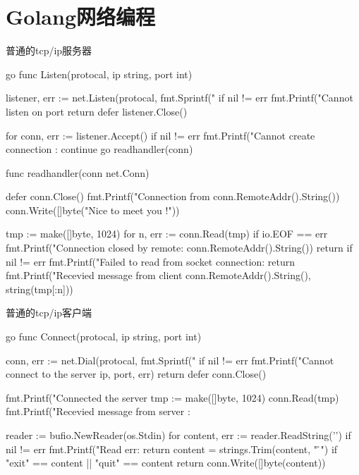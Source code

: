 \section{Golang网络编程}
\begin{outline}[enumerate]

  \1 普通的tcp/ip服务器

\begin{code-in-enumerate}{go}
func Listen(protocal, ip string, port int) {
    listener, err := net.Listen(protocal, fmt.Sprintf("%
    if nil != err {
        fmt.Printf("Cannot listen on port %
        return
    }
    defer listener.Close()

    for {
        conn, err := listener.Accept()
        if nil != err {
            fmt.Printf("Cannot create connection :%
            continue
        }
        go readhandler(conn)
    }
}

func readhandler(conn net.Conn) {
    defer conn.Close()
    fmt.Printf("Connection from %
    conn.RemoteAddr().String())
    conn.Write([]byte("Nice to meet you !\n"))

    tmp := make([]byte, 1024)
    for {
        n, err := conn.Read(tmp)
        if io.EOF == err {
            fmt.Printf("Connection closed by remote: %
            conn.RemoteAddr().String())
            return
        }
        if nil != err {
            fmt.Printf("Failed to read from socket connection:%
            return
        }
        fmt.Printf("Recevied message from client %
        conn.RemoteAddr().String(), string(tmp[:n]))
    }
}
\end{code-in-enumerate}

  \1 普通的tcp/ip客户端

\begin{code-in-enumerate}{go}
func Connect(protocal, ip string, port int) {
    conn, err := net.Dial(protocal, fmt.Sprintf("%
    if nil != err {
        fmt.Printf("Cannot connect to the server %
        ip, port, err)
        return
    }
    defer conn.Close()

    fmt.Printf("Connected the server %
    tmp := make([]byte, 1024)
    conn.Read(tmp)
    fmt.Printf("Recevied message from server :%

    reader := bufio.NewReader(os.Stdin)
    for {
        content, err := reader.ReadString('\n')
        if nil != err {
            fmt.Printf("Read err: %
            return
        }
        content = strings.Trim(content, " \r\n")
        if "exit" == content || "quit" == content {
            return
        }
        conn.Write([]byte(content))
    }
}
\end{code-in-enumerate}


\end{outline}
